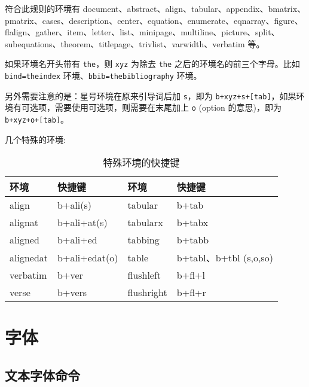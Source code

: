 \documentclass[blue,cn,normal,11pt]{elegantnote}
\begin{document}
符合此规则的环境有 document、abstract、align、tabular、appendix、bmatrix、pmatrix、cases、description、center、equation、enumerate、eqnarray、figure、flalign、gather、item、letter、list、minipage、multiline、picture、split、subequations、theorem、titlepage、trivlist、varwidth、verbatim 等。

\begin{note}
如果环境名开头带有 \lstinline{the}，则 \lstinline{xyz} 为除去 \lstinline{the} 之后的环境名的前三个字母。比如 \lstinline{bind=theindex} 环境、\lstinline{bbib=thebibliography} 环境。
\end{note}

另外需要注意的是：星号环境在原来引导词后加 \lstinline{s}，即为 \lstinline{b+xyz+s+[tab]}，如果环境有可选项，需要使用可选项，则需要在末尾加上 \lstinline{o} (option 的意思)，即为 \lstinline{b+xyz+o+[tab]}。

几个特殊的环境:

\begin{table}[!htbp]
\small
  \centering
  \caption{特殊环境的快捷键}
    \begin{tabular}{llll}
    \toprule
    环境    & 快捷键   & 环境    & 快捷键 \\
    \midrule
    align  & b+ali(s) & tabular  & b+tab \\
    alignat  & b+ali+at(s) & tabularx  & b+tabx \\
    aligned  & b+ali+ed & tabbing  & b+tabb \\
    alignedat  & b+ali+edat(o) & table  & b+tabl、b+tbl (s,o,so) \\
    verbatim  & b+ver  & flushleft  & b+fl+l \\
    verse  & b+vers & flushright  & b+fl+r \\
    \bottomrule
    \end{tabular}%
  \label{tab:special environment}%
\end{table}%

\section{字体}

\subsection{文本字体命令}
\end{document}
